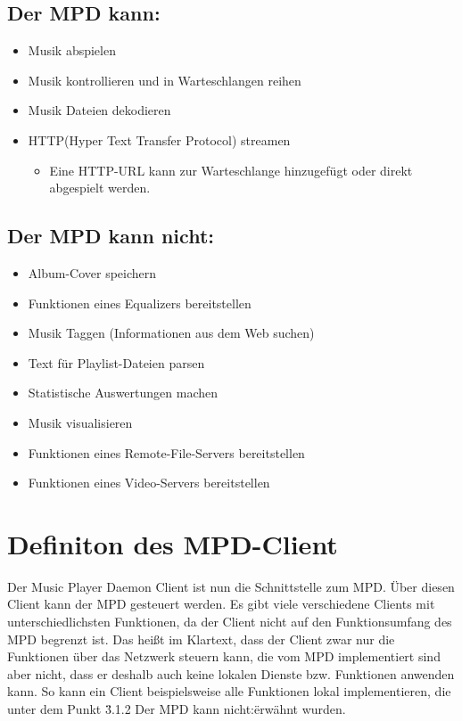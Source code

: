 \subsection{Der MPD kann:}
\renewcommand{\labelitemi}{•}
\begin{itemize}
        \item Musik abspielen
        \item Musik kontrollieren und in Warteschlangen reihen 
        \item Musik Dateien dekodieren
        \item HTTP(Hyper Text Transfer Protocol) streamen
        \renewcommand{\labelitemi}{--}
        \begin{itemize}
                \item Eine HTTP-URL kann zur Warteschlange hinzugefügt oder direkt abgespielt werden.\\
        \end{itemize}
\end{itemize}

\subsection{Der MPD kann nicht:}
\begin{itemize}
        \item Album-Cover speichern
        \item Funktionen eines Equalizers bereitstellen
        \item Musik Taggen (Informationen aus dem Web suchen)
        \item Text für Playlist-Dateien parsen
        \item Statistische Auswertungen machen
        \item Musik visualisieren
        \item Funktionen eines Remote-File-Servers bereitstellen
        \item Funktionen eines Video-Servers bereitstellen
\end{itemize}
\section{Definiton des MPD-Client}
Der Music Player Daemon Client ist nun die Schnittstelle zum MPD. Über diesen Client kann der MPD
gesteuert werden. Es gibt viele verschiedene Clients mit unterschiedlichsten Funktionen, da der 
Client nicht auf den Funktionsumfang des MPD begrenzt ist. Das heißt im Klartext, dass der Client
zwar nur die Funktionen über das Netzwerk steuern kann, die vom MPD implementiert sind aber nicht, 
dass er deshalb auch keine lokalen Dienste bzw. Funktionen anwenden kann. So kann ein Client 
beispielsweise alle Funktionen lokal implementieren, die unter dem Punkt \"3.1.2 Der MPD kann nicht:\" 
erwähnt wurden.
\newpage
